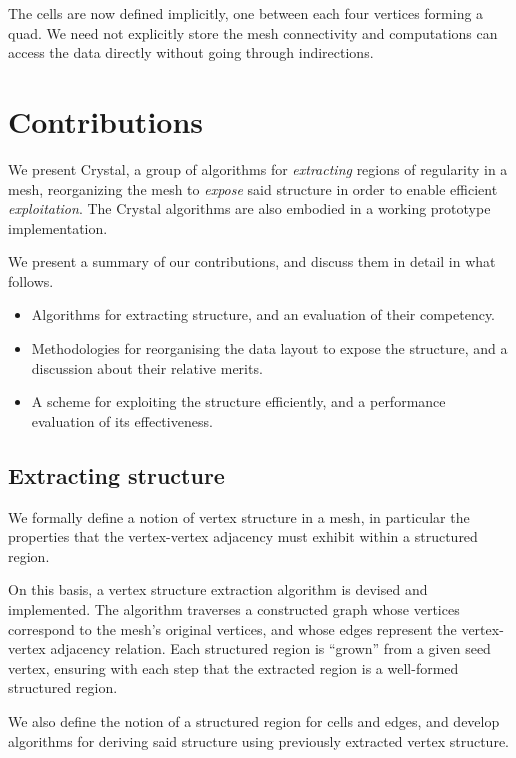 The cells are now defined implicitly, one between each four vertices forming a quad. We need not explicitly store the mesh connectivity and computations can access the data directly without going through indirections.



\section{Contributions}

We present Crystal, a group of algorithms for \emph{extracting} regions of regularity in a mesh, reorganizing the mesh to \emph{expose} said structure in order to enable efficient \emph{exploitation}. The Crystal algorithms are also embodied in a working prototype implementation.

We present a summary of our contributions, and discuss them in detail in what follows.

\begin{itemize}
\item Algorithms for extracting structure, and an evaluation of their competency.
\item Methodologies for reorganising the data layout to expose the structure, and a discussion about their relative merits.
\item A scheme for exploiting the structure efficiently, and a performance evaluation of its effectiveness.
\end{itemize}


\subsection{Extracting structure}
We formally define a notion of vertex structure in a mesh, in particular the properties that the vertex-vertex adjacency must exhibit within a structured region.


On this basis, a vertex structure extraction algorithm is devised and implemented. The algorithm traverses a constructed graph whose vertices correspond to the mesh's original vertices, and whose edges represent the vertex-vertex adjacency relation. Each structured region is ``grown'' from a given seed vertex, ensuring with each step that the extracted region is a well-formed structured region.

We also define the notion of a structured region for cells and edges, and develop algorithms for deriving said structure using previously extracted vertex structure.


